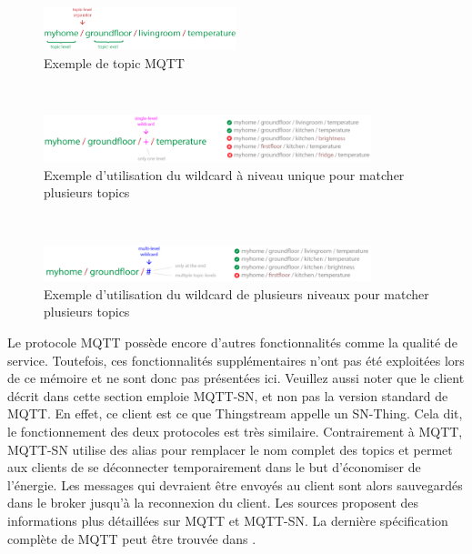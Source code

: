 ~

\begin{figure}[ht!]
  \centering
  \includegraphics[width=0.5\textwidth]{img/app/example_topic.png}
  \caption{Exemple de topic MQTT \cite{mqtt_examples}}
  \label{fig:ex_top}
\end{figure}

~

\begin{figure}[ht!]
  \centering
  \includegraphics[width=0.85\textwidth]{img/app/mqtt_wild1.png}
  \caption{Exemple d'utilisation du wildcard à niveau unique pour matcher plusieurs topics \cite{mqtt_examples}}
  \label{fig:wildmq1}
\end{figure}

~

\begin{figure}[ht!]
  \centering
  \includegraphics[width=0.85\textwidth]{img/app/mqtt_wild2.png}
  \caption{Exemple d'utilisation du wildcard de plusieurs niveaux pour matcher plusieurs topics \cite{mqtt_examples}}
  \label{fig:wildmq2}
\end{figure}


\noindent
Le protocole MQTT possède encore d'autres fonctionnalités comme la qualité de service. Toutefois, ces fonctionnalités supplémentaires n'ont pas été exploitées lors de ce mémoire et ne sont donc pas présentées ici. Veuillez aussi noter que le client décrit dans cette section emploie MQTT-SN, et non pas la version standard de MQTT. En effet, ce client est ce que Thingstream appelle un SN-Thing. Cela dit, le fonctionnement des deux protocoles est très similaire. Contrairement à MQTT, MQTT-SN utilise des alias pour remplacer le nom complet des topics et permet aux clients de se déconnecter temporairement dans le but d'économiser de l'énergie. Les messages qui devraient être envoyés au client sont alors sauvegardés dans le broker jusqu'à la reconnexion du client. Les sources proposent des informations plus détaillées sur MQTT et MQTT-SN. La dernière spécification complète de MQTT peut être trouvée dans \cite{banks2019mqtt}.

